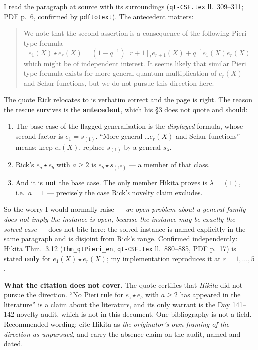 \documentclass[11pt]{article}
\begin{document}
I read the paragraph at source with its surroundings (\texttt{qt-CSF.tex} ll.~309--311;
PDF p.~6, confirmed by \texttt{pdftotext}). The antecedent matters:
\begin{quote}
We note that the second assertion is a consequence of the following Pieri type formula
\[e_1(X)\star e_r(X)=(1-q^{-1})[r+1]_te_{r+1}(X)+q^{-1}e_1(X)e_r(X)\]
which might be of independent interest. It seems likely that similar Pieri type formula
exists for more general quantum multiplication of $e_r(X)$ and Schur functions, but we do not
pursue this direction here.
\end{quote}
The quote Rick relocates to is verbatim correct and the page is right. The reason the rescue
survives is the \textbf{antecedent}, which his \S3 does not quote and should:
\begin{enumerate}
\item The base case of the flagged generalisation is the \emph{displayed} formula, whose
second factor is $e_1=s_{(1)}$. ``More general \dots $e_r(X)$ and Schur functions'' means:
keep $e_r(X)$, replace $s_{(1)}$ by a general $s_\lambda$.
\item Rick's $e_a\star e_b$ with $a\ge2$ is $e_b\star s_{(1^a)}$ --- a member of that class.
\item And it is \textbf{not} the base case. The only member Hikita proves is $\lambda=(1)$,
i.e.\ $a=1$ --- precisely the case Rick's novelty claim excludes.
\end{enumerate}
So the worry I would normally raise --- \emph{an open problem about a general family does not
imply the instance is open, because the instance may be exactly the solved case} --- does not
bite here: the solved instance is named explicitly in the same paragraph and is disjoint from
Rick's range. Confirmed independently: Hikita Thm.\ 3.12 (\texttt{Thm\_qtPieri\_en},
\texttt{qt-CSF.tex} ll.~880--885, PDF p.~17) is stated \textbf{only} for $e_1(X)\star e_r(X)$;
my implementation reproduces it at $r=1,\dots,5$.

\textbf{What the citation does not cover.} The quote certifies that \emph{Hikita} did not
pursue the direction. ``No Pieri rule for $e_a\star e_b$ with $a\ge2$ has appeared in the
literature'' is a claim about the literature, and its only warrant is the Day 141--142 novelty
audit, which is not in this document. One bibliography is not a field. Recommended wording:
cite Hikita as \emph{the originator's own framing of the direction as unpursued}, and carry
the absence claim on the audit, named and dated.
\end{document}
